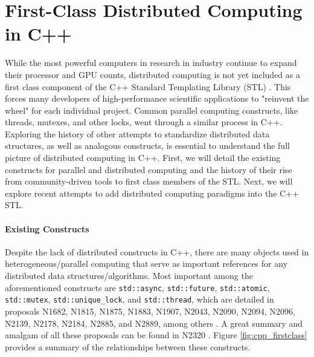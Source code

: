 \section{First-Class Distributed Computing in C++} \label{first_class_dist_cpp}
While the most powerful computers in research in industry continue to expand their processor and GPU counts,
distributed computing is not yet included as a first class component of the C++ Standard Templating Library (STL) \cite{towards_dist_cpp}. This forces many developers of high-performance scientific applications to "reinvent the wheel" for each individual project.  Common parallel computing constructs, like threads, mutexes, and other locks, went through a similar process in C++. Exploring the history of other attempts to standardize distributed data structures, as well as analogous constructs, is essential to understand the full picture of distributed computing in C++. First, we will detail the existing constructs for parallel and distributed computing and the history of their rise from community-driven tools to first class members of the STL. Next, we will explore recent attempts to add distributed computing paradigms into the C++ STL. 


\paragraph{Existing Constructs}
Despite the lack of distributed constructs in C++, there are many objects used in heterogeneous/parallel computing that serve as important references for any distributed data structures/algorithms. Most important among the aforementioned constructs are \texttt{std::async}, \texttt{std::future}, \texttt{std::atomic}, \texttt{std::mutex}, \texttt{std::unique\_lock}, and \texttt{std::thread}, which are detailed in proposals N1682, N1815, N1875, N1883, N1907, N2043, N2090, N2094,  N2096, N2139, N2178, N2184, N2885, and N2889, among others  \cite{n1682} \cite{n1815} \cite{n1875} \cite{n1883} \cite{n1907} \cite{n2043} \cite{n2096} \cite{n2139} \cite{n2178} \cite{n2184} \cite{n2285} \cite{n2889}. A great summary and amalgam of all these proposals can be found in N2320 \cite{n2320}. Figure \ref{fig:cpp_firstclass} provides a summary of the relationships between these constructs.


